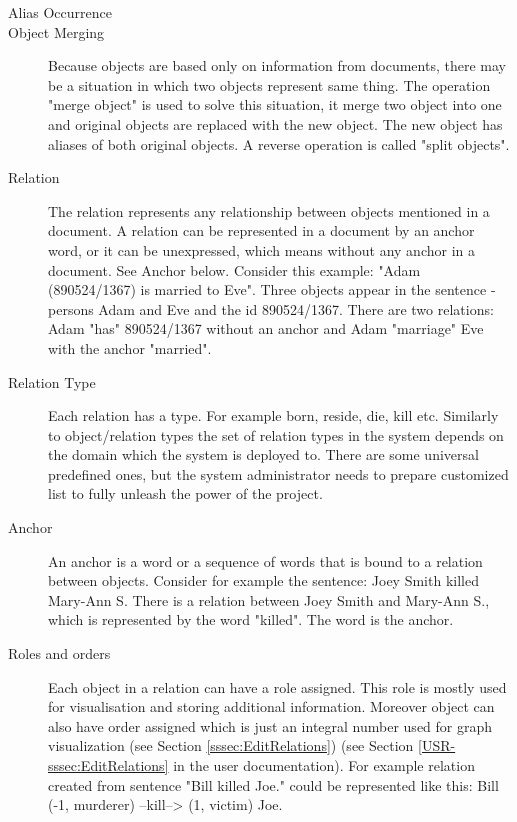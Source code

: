 \begin{description}
\item[Alias Occurrence]

\item[Object Merging]
Because objects are based only on information from documents, there may be a situation
in which two objects represent same thing. The operation "merge object" is used
to solve this situation, it merge two object into one and original objects are
replaced with the new object. The new object has aliases of both original objects.
A reverse operation is called "split objects".

\item[Relation]
The relation represents any relationship between objects mentioned in a document.
A relation can be represented in a document by an anchor word, or it can be
unexpressed, which means without any anchor in a document. See Anchor below.
Consider this example: "Adam (890524/1367) is married to Eve". Three objects
appear in the sentence - persons Adam and Eve and the id 890524/1367. There
are two relations: Adam "has" 890524/1367 without an anchor and Adam "marriage"
Eve with the anchor "married".

\item[Relation Type]
Each relation has a type. For example born, reside, die, kill etc. Similarly to
object/relation types the set of relation types in the system depends on the
domain which the system is deployed to. There are some universal predefined 
ones, but the system administrator needs to prepare customized list to fully 
unleash the power of the project. 

\item[Anchor]
An anchor is a word or a sequence of words that is bound to a relation between
objects. Consider for example the sentence: Joey Smith killed Mary-Ann S. There
is a relation between Joey Smith and Mary-Ann S., which is represented by the
word "killed". The word is the anchor.

\item[Roles and orders]
Each object in a relation can have a role assigned. This role is mostly used
for visualisation and storing additional information. Moreover object can also
have order assigned which is just an integral number used for graph
visualization\ifdefined\USRDOC{} (see Section \ref{sssec:EditRelations})\fi{}
\ifdefined\DEVDOC{} (see Section \ref{USR-sssec:EditRelations} in the user
documentation)\fi{}. For example relation created from sentence
"Bill killed Joe." could be represented like this:
Bill (-1, murderer) --kill--> (1, victim) Joe.
\end{description}

